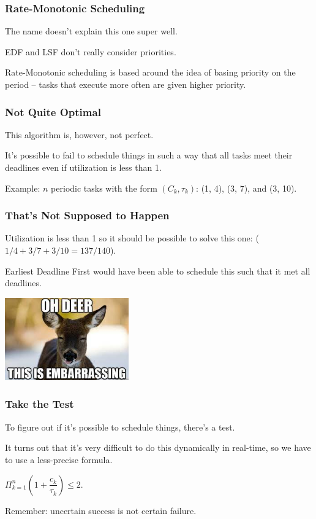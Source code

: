 \begin{frame}
\frametitle{Rate-Monotonic Scheduling}

The name doesn't explain this one super well.

EDF and LSF don't really consider priorities.

Rate-Monotonic scheduling is based around the idea of basing priority on the period -- tasks that execute more often are given higher priority.

\end{frame}

\begin{frame}
\frametitle{Not Quite Optimal}

This algorithm is, however, not perfect.

It's possible to fail to schedule things in such a way that all tasks meet their deadlines even if utilization is less than 1.

Example: $n$ periodic tasks with the form $(C_{k}, \tau _{k})$: (1, 4), (3, 7), and (3, 10).

\end{frame}

\begin{frame}
\frametitle{That's Not Supposed to Happen}


Utilization is less than 1 so it should be possible to solve this one: ($1/4 + 3/7 + 3/10 = 137/140$). 

Earliest Deadline First would have been able to schedule this such that it met all deadlines. 

\begin{center}
	\includegraphics[width=0.4\textwidth]{images/deer.jpg}
\end{center}

\end{frame}

\begin{frame}
\frametitle{Take the Test}

To figure out if it's possible to schedule things, there's a test. 

It turns out that it's very difficult to do this dynamically in real-time, so we have to use a less-precise formula.

\begin{center}
	$\Pi^{n}_{k=1}( 1 + \dfrac{c_k}{\tau _k}) \leq 2$.
\end{center}

Remember: uncertain success is not certain failure.

\end{frame}

